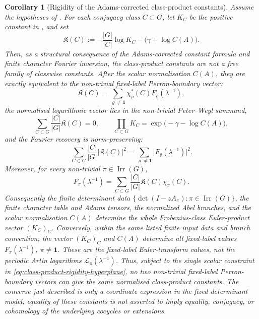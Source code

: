 \documentclass[11pt,a4paper]{amsart}
\theoremstyle{plain}
\newtheorem{corollary}[theorem]{Corollary}
\theoremstyle{definition}
\theoremstyle{remark}
\DeclareMathOperator{\Irr}{Irr}
\newcommand{\abs}[1]{\lvert #1 \rvert}
\begin{document}
\begin{corollary}[Rigidity of the Adams-corrected class-product constants]
  \label{cor:class-product-constant-rigidity}
  Assume the hypotheses of .  For each
  conjugacy class \(C\subset G\), let \(K_C\) be the positive constant in
  , and set
  \begin{equation}\label{eq:class-product-normalised-log-vector}
    \mathfrak K(C)
    :=
    -\frac{|G|}{|C|}\log K_C-\bigl(\gamma+\log C(A)\bigr).
  \end{equation}
  Then, as a structural consequence of the Adams-corrected constant formula
  and finite character Fourier inversion, the class-product constants are
  not a free family of classwise constants.  After the scalar normalisation
  \(C(A)\), they are exactly equivalent to the non-trivial fixed-label
  Perron-boundary vector:
  \begin{equation}\label{eq:class-product-rigidity-forward}
    \mathfrak K(C)
    =
    \sum_{\varrho\neq\mathbf1}
      \chi_\varrho^\ast(C)F_\varrho(\lambda^{-1}),
  \end{equation}
  the normalised logarithmic vector lies in the non-trivial Peter--Weyl
  summand,
  \begin{equation}\label{eq:class-product-rigidity-hyperplane}
    \sum_{C\subset G}\frac{|C|}{|G|}\mathfrak K(C)=0,
    \qquad
    \prod_{C\subset G}K_C=
      \exp\!\bigl(-\gamma-\log C(A)\bigr),
  \end{equation}
  and the Fourier recovery is norm-preserving:
  \begin{equation}\label{eq:class-product-rigidity-parseval}
    \sum_{C\subset G}\frac{|C|}{|G|}\abs{\mathfrak K(C)}^2
    =
    \sum_{\varrho\neq\mathbf1}
      \abs{F_\varrho(\lambda^{-1})}^2.
  \end{equation}
  Moreover, for every non-trivial \(\pi\in\Irr(G)\),
  \begin{equation}\label{eq:class-product-rigidity-inverse}
    F_\pi(\lambda^{-1})
    =
    \sum_{C\subset G}\frac{|C|}{|G|}\mathfrak K(C)\chi_\pi(C).
  \end{equation}
  Consequently the finite determinant data
  \(\{\det(I-zA_\pi):\pi\in\Irr(G)\}\), the finite character table and
  Adams tensors, the normalized Abel branches, and the scalar normalisation
  \(C(A)\) determine the whole Frobenius-class Euler-product vector
  \((K_C)_C\). Conversely, within the same listed finite input data and branch
  convention, the vector \((K_C)_C\) and \(C(A)\) determine all fixed-label
  values \(F_\pi(\lambda^{-1})\), \(\pi\neq\mathbf1\). These are the
  fixed-label Euler-transform values, not the periodic Artin logarithms
  \(\mathcal L_\pi(\lambda^{-1})\). Thus, subject to the single scalar
  constraint in \eqref{eq:class-product-rigidity-hyperplane}, no two
  non-trivial fixed-label Perron-boundary vectors can give the same
  normalised class-product constants.  The converse just described is only
  a coordinate expression in the fixed determinant model; equality of these
  constants is not asserted to imply equality, conjugacy, or cohomology of
  the underlying cocycles or extensions.
\end{corollary}
\end{document}
